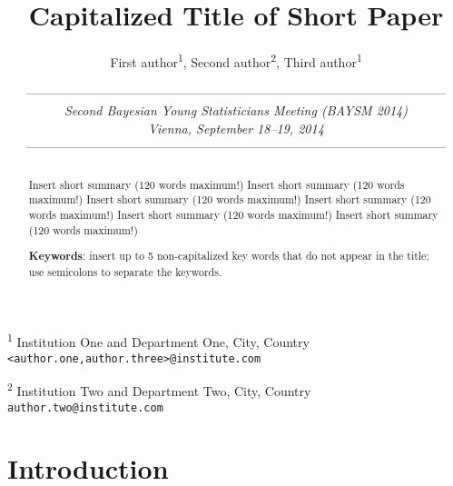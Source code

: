 \documentclass[11pt,a4paper]{article}
\begin{document}
\title{Capitalized Title of Short Paper}

\date{
\small{---------------------------------------------------------------------------------------------------
\\
\textit{Second Bayesian Young Statisticians Meeting (BAYSM 2014)\\
Vienna,  September 18--19, 2014}
\\[-.3em]
---------------------------------------------------------------------------------------------------}
}

\author{First author\textsuperscript{1}, Second author\textsuperscript{2}, Third author\textsuperscript{1}}

\maketitle

\begin{center}
 \vspace{-.5em}
 {\small \textsuperscript{1} Institution One and Department One, City, Country\\[-.3em]
 {\tt <author.one,author.three>@institute.com}}
 
 \vspace{.5em}

{\small \textsuperscript{2} Institution Two and Department Two, City, Country\\[-.3em]
{\tt author.two@institute.com}}

\end{center}

\vspace*{0.5em}

\begin{abstract}

 Insert short summary (120 words maximum!) Insert short summary (120 words maximum!) Insert short summary (120 words maximum!) Insert short summary (120 words maximum!) Insert short summary (120 words maximum!) Insert short summary (120 words maximum!) 

\textbf{Keywords}: insert up to 5 non-capitalized key words that do not appear in the title; use semicolons to separate the keywords.

\end{abstract}

\section{Introduction}
\label{Sect:intro}
\end{document}
